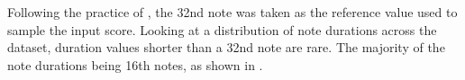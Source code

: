 
Following the practice of \textcite{micchi2020not}, the
\gls{32nd} note was taken as the reference value used to
sample the input score. Looking at a distribution of note
durations across the dataset, duration values shorter than a
\gls{32nd} note are rare. The majority of the note durations
being \gls{16th} notes, as shown in
.

